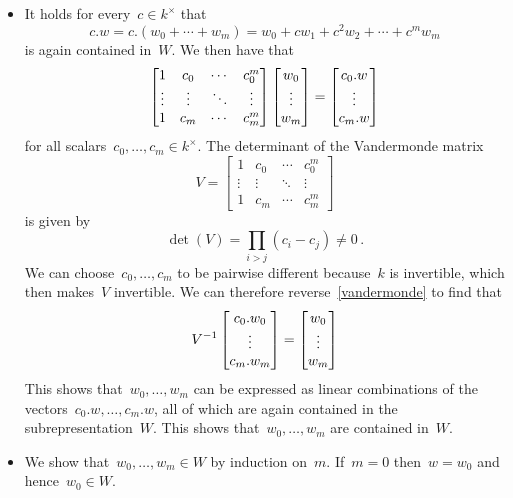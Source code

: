 \begin{itemize}
  \item
    It holds for every~$c \in k^\times$ that
    \[
          c.w
      =   c.(w_0 + \dotsb + w_m)
      =   w_0 + c w_1 + c^2 w_2 + \dotsb + c^m w_m
    \]
    is again contained in~$W$.
    We then have that
    \begin{equation}
      \label{vandermonde}
      \begin{bmatrix}
        1       & c_0     & \cdots  & c_0^m   \\
        \vdots  & \vdots  & \ddots  & \vdots  \\
        1       & c_m     & \cdots  & c_m^m
      \end{bmatrix}
      \begin{bmatrix} w_0 \\ \vdots \\ w_m \end{bmatrix}
      =
      \begin{bmatrix} c_0.w \\ \vdots \\ c_m.w \end{bmatrix}
    \end{equation}
    for all scalars~$c_0, \dotsc, c_m \in k^\times$.
    The determinant of the Vandermonde matrix
    \[
        V
      = \begin{bmatrix}
          1       & c_0     & \cdots  & c_0^m   \\
          \vdots  & \vdots  & \ddots  & \vdots  \\
          1       & c_m     & \cdots  & c_m^m
        \end{bmatrix}
    \]
    is given by
    \[
            \det(V)
      =     \prod_{i > j} (c_i - c_j)
      \neq  0 \,.
    \]
    We can choose~$c_0, \dotsc, c_m$ to be pairwise different because~$k$ is invertible, which then makes~$V$ invertible.
    We can therefore reverse~\eqref{vandermonde} to find that
    \[
        V^{-1}
        \begin{bmatrix} c_0.w_0 \\ \vdots \\ c_m.w_m \end{bmatrix}
      = \begin{bmatrix} w_0 \\ \vdots \\ w_m \end{bmatrix}
    \]
    This shows that~$w_0, \dotsc, w_m$ can be expressed as linear combinations of the vectors~$c_0.w, \dotsc, c_m.w$, all of which are again contained in the subrepresentation~$W$.
    This shows that~$w_0, \dotsc, w_m$ are contained in~$W$.
  \item
    We show that~$w_0, \dotsc, w_m \in W$ by induction on~$m$.
    If~$m = 0$ then~$w = w_0$ and hence~$w_0 \in W$.
    

\end{itemize}
